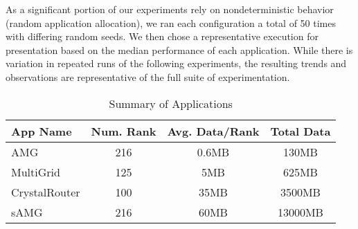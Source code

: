 As a significant portion of our experiments rely on nondeterministic behavior (random application allocation), we ran each configuration a total of 50 times with differing random seeds. We then chose a representative execution for presentation based on the median performance of each application. While there is variation in repeated runs of the following experiments, the resulting trends and observations are representative of the full suite of experimentation.

\begin{table}[ht]
\begin{center}
\caption{Summary of Applications}
\label{tab:apps-detail}
\begin{tabular}{l c c c }
\toprule %
\toprule
App Name & Num. Rank & Avg. Data/Rank & Total Data\\ %
\midrule %
AMG  &    216 &   0.6MB   &     130MB\\ %
\midrule
MultiGrid  &    125 &   5MB   &     625MB\\ 
\midrule
CrystalRouter  &   100  &  35MB    &     3500MB\\ 
\midrule
sAMG  &    216 &   60MB   &     13000MB\\ %
\midrule %
\bottomrule %
\end{tabular}
\end{center}
\end{table}

